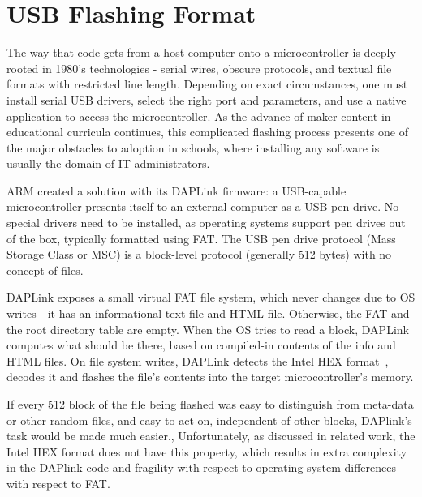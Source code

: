 \section{USB Flashing Format}
\label{sec:uf2}

The way that code gets from a host computer onto a microcontroller is deeply rooted in 1980's technologies - 
serial wires, obscure protocols, and textual file formats with restricted line length. Depending on exact circumstances,
one must install serial USB drivers, select the right port and parameters, and use a native application to access
the microcontroller. As the advance of maker content in educational curricula continues,
this complicated flashing process presents one of the major obstacles to adoption in schools, 
where installing any software is usually the domain of IT administrators.

ARM created a solution with its DAPLink firmware: a USB-capable microcontroller presents itself 
to an external computer as a USB pen drive. No special drivers need to be installed, as operating systems support pen
drives out of the box, typically formatted using FAT. The USB pen drive protocol (Mass Storage Class or MSC) is a
block-level protocol (generally 512 bytes) with no concept of files. 

DAPLink exposes a small virtual FAT file system, which
never changes due to OS writes - it has an informational text file and HTML file. 
Otherwise, the FAT and the root directory table are empty. When the OS tries to read a block,
DAPLink computes what should be there, 
based on compiled-in contents of the info and HTML files.
On file system writes, DAPLink detects the Intel HEX format~\cite{IntelHEX}, 
decodes it and flashes the file's contents into the target microcontroller's memory. 

If every 512 block of the file being flashed was easy to distinguish from meta-data
or other random files, and easy to act on, independent of other blocks, DAPlink's
task would be made much easier., Unfortunately, as discussed in related work, 
the Intel HEX format does not have this property, which results in extra complexity
in the DAPlink code and fragility with respect to operating system differences with
respect to FAT. 

